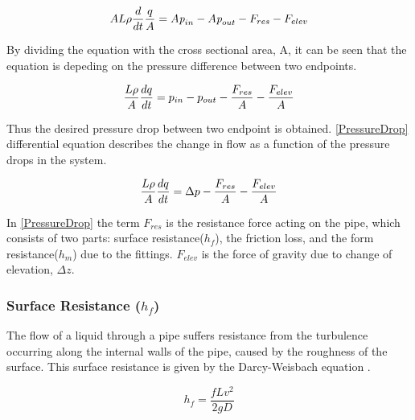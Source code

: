 \begin{equation}
    A L \rho \frac{d}{dt} \frac{q}{A} = A \textit{p}_{in} - A \textit{p}_{out} - F_{res} - F_{elev}\\
\end{equation}

By dividing the equation with the cross sectional area, A, it can be seen that the equation is depeding on the pressure difference between two endpoints. 

\begin{equation}
    \frac{L \rho}{A} \frac{dq}{dt} =p_{in} - p_{out} - \frac{ F_{res}}{A} - \frac{ F_{elev}}{A} \\
\end{equation}

Thus the desired pressure drop between two endpoint is obtained. \eqref{PressureDrop} differential equation describes the change in flow as a function of the pressure drops in the system.

\begin{equation}
    \frac{L \rho}{A} \frac{dq}{dt} =\Delta p - \frac{ F_{res}}{A} - \frac{ F_{elev}}{A} \\
    \label{PressureDrop}
\end{equation}

In \eqref{PressureDrop} the term $F_{res}$ is the resistance force acting on the 
pipe, which consists of two parts: surface resistance($h_{f}$), the friction 
loss, and the form resistance($h_{m}$) due to the fittings. $F_{elev}$ is the force of gravity due to change of elevation, $\Delta z$.

\subsubsection{Surface Resistance (\texorpdfstring{$h_f$}{})} 
The flow of a liquid through a pipe suffers resistance from 
the turbulence occurring along the internal walls of the pipe, caused by the roughness of the surface. This surface resistance is given by the Darcy-Weisbach equation \cite{Design_Water}.

\begin{equation}
  h_f = \frac{fLv^2}{2gD}
  \label{Darcy}
\end{equation}

